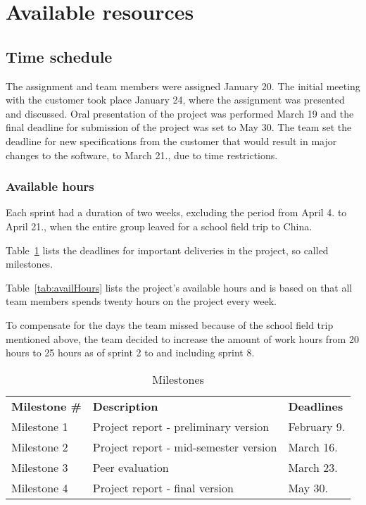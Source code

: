 \section{Available resources}
\subsection{Time schedule}
The assignment and team members were assigned January 20. The initial meeting with the customer took place January 24, where the assignment was presented and discussed. Oral presentation of the project was performed March 19 and the final deadline for submission of the project was set to May 30. The team set the deadline for new specifications from the customer that would result in major changes to the software, to March 21., due to time restrictions.

\subsubsection{Available hours}
Each sprint had a duration of two weeks, excluding the period from April 4. to April 21., when the entire group leaved for a school field trip to China.

Table~\ref{tab:milestones} lists the deadlines for important deliveries in the project, so called milestones.

Table~\ref{tab:availHours} lists the project's available hours and is based on that all team members spends twenty hours on the project every week.

To compensate for the days the team missed because of the school field trip mentioned above, the team decided to increase the amount of work hours from 20 hours to 25 hours as of sprint 2 to and including sprint 8.

\begin{table}[H]
\centering
{}
\begin{tabular}{|l|l|l|}
\hline
\textbf{Milestone \#} & \textbf{Description} & \textbf{Deadlines}\\
Milestone 1& Project report - preliminary version & February 9. \\
Milestone 2 & Project report - mid-semester version & March 16.  \\
Milestone 3 & Peer evaluation & March 23.  \\
 Milestone 4 & Project report - final version & May 30.\\\hline
\end{tabular}
\caption{Milestones}
\label{tab:milestones}
\end{table}

